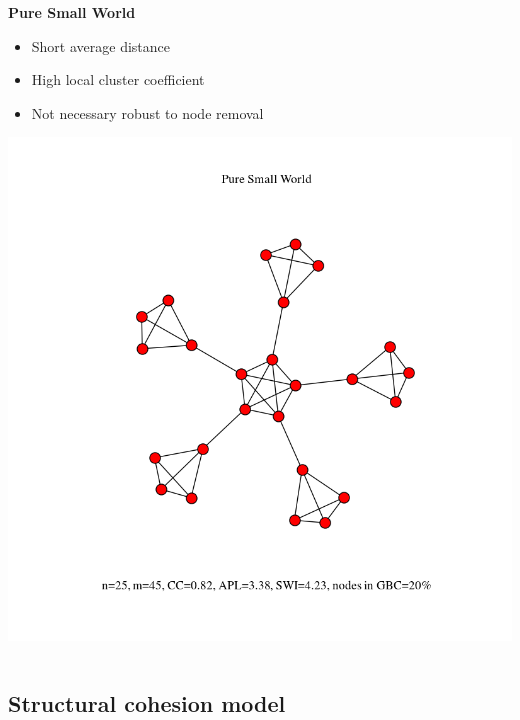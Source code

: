 \documentclass[ignorenonframetext,red,8pt]{beamer}
\begin{document}
\begin{frame}
\begin{columns}[c]
\begin{column}{0.33\textwidth}
\begin{center}
\textbf{Pure Small World}
\end{center}
\begin{itemize}
\item Short average distance
\item High local cluster coefficient
\item Not necessary robust to node removal
\end{itemize}
\includegraphics[scale=0.2]{../../figures/model_small_world_25}
\end{column}
\end{columns}

\end{frame}


\subsection{Structural cohesion model}
\end{document}
